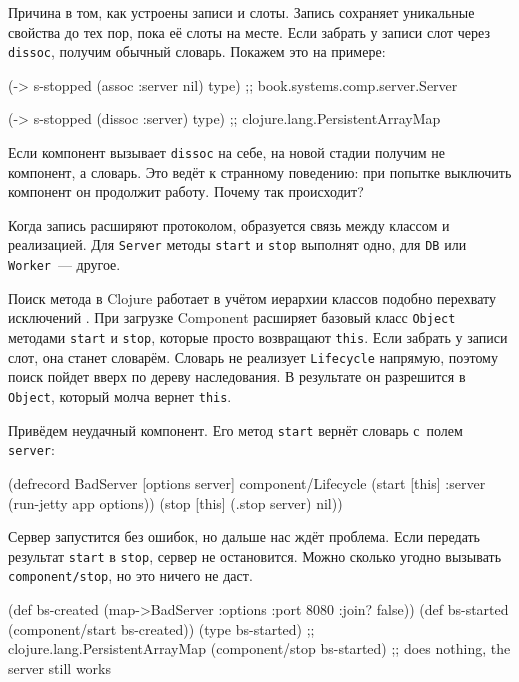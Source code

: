 Причина в том, как устроены записи и слоты. Запись сохраняет уникальные свойства
до тех пор, пока её слоты на месте. Если забрать у записи слот через
\verb|dissoc|, получим обычный словарь. Покажем это на примере:

\begin{english}
  \begin{clojure}
(-> s-stopped (assoc :server nil) type)
;; book.systems.comp.server.Server

(-> s-stopped (dissoc :server) type)
;; clojure.lang.PersistentArrayMap
  \end{clojure}
\end{english}

Если компонент вызывает \verb|dissoc| на себе, на новой стадии получим не
компонент, а словарь. Это ведёт к странному поведению: при попытке выключить
компонент он продолжит работу. Почему так происходит?

Когда запись расширяют протоколом, образуется связь между классом и
реализацией. Для \verb|Server| методы \verb|start| и \verb|stop| выполнят
одно, для \verb|DB| или \verb|Worker|~--- другое.

Поиск метода в Clojure работает в учётом иерархии классов подобно перехвату
исключений . При загрузке Component расширяет базовый класс
\verb|Object| методами \verb|start| и \verb|stop|, которые просто
возвращают \verb|this|. Если забрать у записи слот, она станет
словарём. Словарь не реализует \verb|Lifecycle| напрямую, поэтому поиск пойдет
вверх по дереву наследования. В результате он разрешится в \verb|Object|,
который молча вернет \verb|this|.

Привёдем неудачный компонент. Его метод \verb|start| вернёт словарь с~полем
\verb|server|:

\begin{english}
  \begin{clojure}
(defrecord BadServer [options server]
  component/Lifecycle
  (start [this]
    {:server (run-jetty app options)})
  (stop [this]
    (.stop server)
    nil))
  \end{clojure}
\end{english}

Сервер запустится без ошибок, но дальше нас ждёт проблема. Если передать
результат \verb|start| в \verb|stop|, сервер не остановится. Можно сколько
угодно вызывать \verb|component/stop|, но это ничего не даст.

\begin{english}
  \begin{clojure}
(def bs-created (map->BadServer
                  {:options {:port 8080 :join? false}}))
(def bs-started (component/start bs-created))
(type bs-started)
;; clojure.lang.PersistentArrayMap
(component/stop bs-started)
;; does nothing, the server still works
  \end{clojure}
\end{english}

